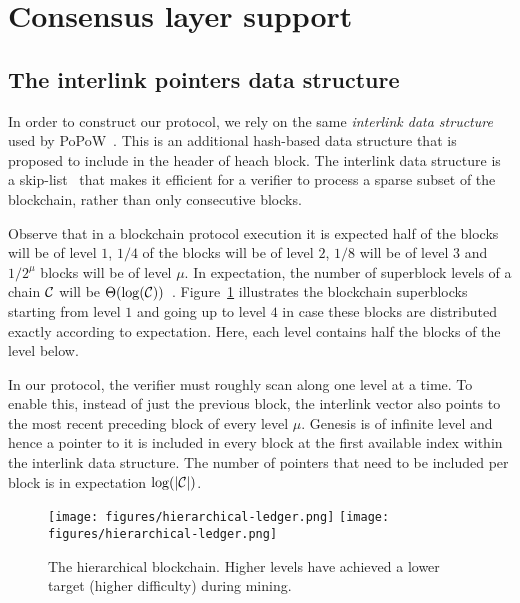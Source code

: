 \section{Consensus layer support} \label{sec.consensus}

\label{sec.interlink}

\subsection{The interlink pointers data structure}
In order to construct our protocol, we rely on the same \emph{interlink data structure} used by PoPoW~\cite{KLS}. This is an
additional hash-based data structure that is proposed to include in the header of heach block.
The interlink data structure is a skip-list~\cite{skiplist} that makes it efficient for a verifier to process a sparse subset of the blockchain, rather than only consecutive blocks.


Observe that in a
blockchain protocol execution it is expected half of the blocks will be of level
$1$, $1/4$ of the blocks will be of level $2$, $1/8$ will be of level $3$ and
$1/2^\mu$ blocks will be of level $\mu$. In expectation, the number of
superblock levels of a chain $\mathcal{C}$ will be $\Theta(\log(\mathcal{C}))$~\cite{KLS}.
Figure~\ref{fig.hierarchy} illustrates the blockchain superblocks starting from
level $1$ and going up to level $4$ in case these blocks are distributed exactly
according to expectation. Here, each level contains half the blocks of the level
below.

In our protocol, the verifier must roughly scan along one level at a time.
To enable this, 
instead of just the previous block, the interlink vector also points to
the most recent preceding block of every level $\mu$.
Genesis is of infinite level and hence a pointer to it
is included in every block at the first available index within the interlink
data structure. The number of pointers that need
to be included per block is in expectation $\log(|\mathcal{C}|)$.

\begin{figure}
    \caption{The hierarchical blockchain.
    Higher levels have achieved a lower target (higher difficulty) during mining.}
    \centering
    \iftwocolumn
        \texttt{[image: figures/hierarchical-ledger.png]}
    \else
        \texttt{[image: figures/hierarchical-ledger.png]}
    \fi
    \label{fig.hierarchy}
\end{figure}

